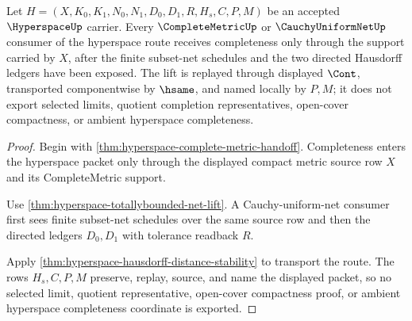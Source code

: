 \begin{theorem}
\label{thm:hyperspace-completemetric-cauchy-lift}
Let $H=(X,K_0,K_1,N_0,N_1,D_0,D_1,R,H_s,C,P,M)$ be an accepted $\HyperspaceUp$ carrier. Every $\CompleteMetricUp$ or $\CauchyUniformNetUp$ consumer of the hyperspace route receives completeness only through the support carried by $X$, after the finite subset-net schedules and the two directed Hausdorff ledgers have been exposed. The lift is replayed through displayed $\Cont$, transported componentwise by $\hsame$, and named locally by $P,M$; it does not export selected limits, quotient completion representatives, open-cover compactness, or ambient hyperspace completeness.
\end{theorem}
\begin{proof}
Begin with \autoref{thm:hyperspace-complete-metric-handoff}. Completeness enters the hyperspace packet only through the displayed compact metric source row $X$ and its CompleteMetric support.

Use \autoref{thm:hyperspace-totallybounded-net-lift}. A Cauchy-uniform-net consumer first sees finite subset-net schedules over the same source row and then the directed ledgers $D_0,D_1$ with tolerance readback $R$.

Apply \autoref{thm:hyperspace-hausdorff-distance-stability} to transport the route. The rows $H_s,C,P,M$ preserve, replay, source, and name the displayed packet, so no selected limit, quotient representative, open-cover compactness proof, or ambient hyperspace completeness coordinate is exported.
\end{proof}


